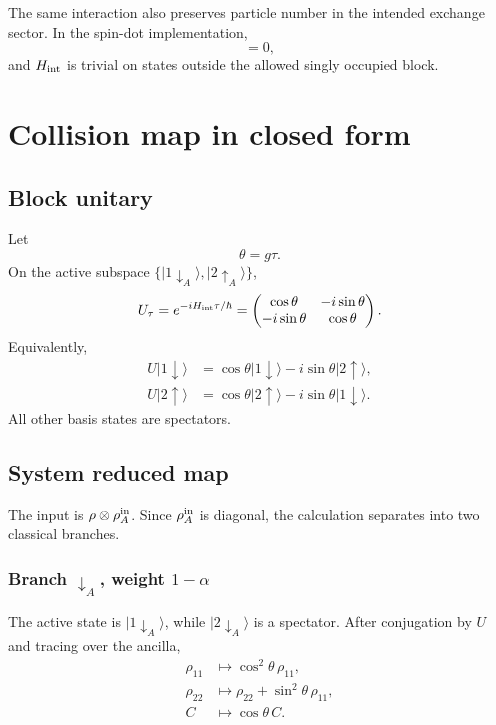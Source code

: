 \documentclass[11pt,a4paper]{article}
\newcommand{\ket}[1]{|#1\rangle}
\begin{document}
The same interaction also preserves particle number in the intended exchange sector. In the spin-dot implementation,
\begin{equation}
[H_{\rm int},N_S+N_A]=0,
\end{equation}
and $H_{\rm int}$ is trivial on states outside the allowed singly occupied block.

\section{Collision map in closed form}

\subsection{Block unitary}

Let
\begin{equation}
\theta=g\tau.
\end{equation}
On the active subspace $\{\ket{1\downarrow_A},\ket{2\uparrow_A}\}$,
\begin{equation}
U_\tau=e^{-iH_{\rm int}\tau/\hbar}=\begin{pmatrix}
\cos\theta & -i\sin\theta\\
-i\sin\theta & \cos\theta
\end{pmatrix}.
\end{equation}
Equivalently,
\begin{align}
U\ket{1\downarrow}&=\cos\theta\ket{1\downarrow}-i\sin\theta\ket{2\uparrow},\\
U\ket{2\uparrow}&=\cos\theta\ket{2\uparrow}-i\sin\theta\ket{1\downarrow}.
\end{align}
All other basis states are spectators.

\subsection{System reduced map}

The input is $\rho\otimes\rho_A^{\rm in}$. Since $\rho_A^{\rm in}$ is diagonal, the calculation separates into two classical branches.

\subsubsection*{Branch $\downarrow_A$, weight $1-\alpha$}

The active state is $\ket{1\downarrow_A}$, while $\ket{2\downarrow_A}$ is a spectator. After conjugation by $U$ and tracing over the ancilla,
\begin{align}
\rho_{11}&\mapsto \cos^2\theta\,\rho_{11},\\
\rho_{22}&\mapsto \rho_{22}+\sin^2\theta\,\rho_{11},\\
C&\mapsto \cos\theta\,C.
\end{align}
\end{document}
